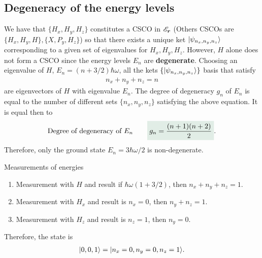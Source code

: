 \subsection{Degeneracy of the energy levels}
We have that $\{H_x,H_y,H_z\}$ constitutes a CSCO in $\mathscr{E}_{\bm{r}}$ (Others CSCOs are $\{H_x,H_y,H\},\{X,P_y,H_z\}$) so that there exists a unique ket $|\psi_{n_x,n_y,n_z}\rangle$ corresponding to a given set of eigenvalues for $H_x,H_y,H_z$.
However, $H$ alone does not form a CSCO since the energy levels $E_n$ are \textbf{degenerate}. Choosing an eigenvalue of $H$, $E_n=(n+3/2)\hbar\omega$, all the kets $\{|\psi_{n_x,n_y,n_z}\rangle\}$ basis that 
satisfy 
\begin{align*}
    n_x+n_y+n_z=n
\end{align*}
are eigenvectors of $H$ with eigenvalue $E_n$.
The degree of degeneracy $g_n$ of $E_n$ is equal to the number of different sets $\{n_x,n_y,n_z\}$ satisfying the above equation. It is equal then to 
\begin{align}
    \text{Degree of degeneracy of $E_n$}\qquad\highlight{g_n=\frac{(n+1)(n+2)}{2}}.
\end{align}
Therefore, only the ground state $E_n=3\hbar\omega/2$ is non-degenerate.

\begin{example}{Measurements of energies}
    \begin{enumerate}[itemsep=0pt,topsep=0pt,label=\alph*)]
        \item Measurement with $H$ and result if $\hbar\omega(1+3/2)$, then $n_x+n_y+n_z=1$.
        \item Measurement with $H_x$ and result is $n_x=0$, then $n_y+n_z=1$.
        \item Measurement with $H_z$ and result is $n_z=1$, then $n_y=0$.
    \end{enumerate}
    Therefore, the state is 
    \begin{align*}
        |0,0,1\rangle=|n_x=0,n_y=0,n_z=1\rangle.
    \end{align*}
\end{example}





